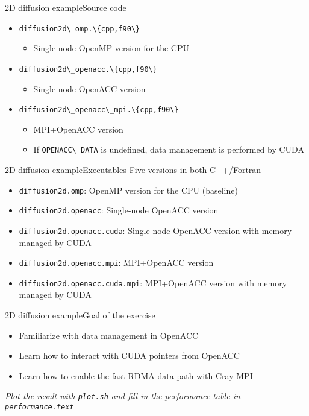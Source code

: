 \documentclass[aspectratio=169,12pt]{beamer}
\newcommand\shinline[2][]{\lstinline[style=shstyle,basicstyle=\ttfamily,#1]!#2!}
\begin{document}
\begin{frame}[fragile]{2D diffusion example}{Source code}
  \begin{itemize}
  \item \shinline{diffusion2d\_omp.\{cpp,f90\}}
    \begin{itemize}
    \item Single node OpenMP version for the CPU
    \end{itemize}
  \item \shinline{diffusion2d\_openacc.\{cpp,f90\}}
    \begin{itemize}
    \item Single node OpenACC version
    \end{itemize}
  \item \shinline{diffusion2d\_openacc\_mpi.\{cpp,f90\}}
    \begin{itemize}
    \item MPI+OpenACC version
    \item If \shinline{OPENACC\_DATA} is undefined, data management is performed by CUDA
    \end{itemize}
  \end{itemize}
\end{frame}


\begin{frame}[fragile]{2D diffusion example}{Executables}
  Five versions in both C++/Fortran
  \vspace\baselineskip
  \begin{itemize}
  \item \shinline{diffusion2d.omp}: OpenMP version for the CPU (baseline)
  \item \shinline{diffusion2d.openacc}: Single-node OpenACC version
  \item \shinline{diffusion2d.openacc.cuda}: Single-node OpenACC version with memory managed by CUDA
  \item \shinline{diffusion2d.openacc.mpi}: MPI+OpenACC version
  \item \shinline{diffusion2d.openacc.cuda.mpi}: MPI+OpenACC version with memory managed by CUDA
  \end{itemize}
\end{frame}

\begin{frame}[fragile]{2D diffusion example}{Goal of the exercise}
  \begin{itemize}
  \item Familiarize with data management in OpenACC
  \item Learn how to interact with CUDA pointers from OpenACC
  \item Learn how to enable the fast RDMA data path with Cray MPI
  \end{itemize}
  \vfill
  \emph{Plot the result with \shinline{plot.sh} and fill in the performance table in \shinline{performance.text}}
\end{frame}
\end{document}
